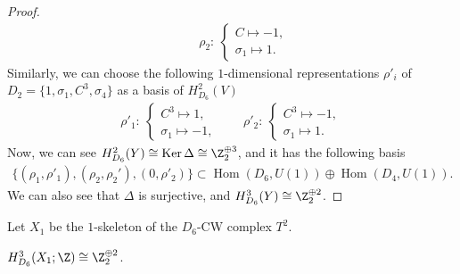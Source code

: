 \begin{proof}
\begin{gather*}
\qquad
\rho_2 \colon \
\begin{cases}
C \mapsto -1, \\
\sigma_1 \mapsto 1.
\end{cases}
\end{gather*}
Similarly, we can choose the following $1$-dimensional representations $\rho'_i$ of $D_2 = \{ 1, \sigma_1, C^3, \sigma_4 \}$ as a basis of $H^2_{D_6}(V)$
\begin{gather*}
\rho'_1 \colon \
\begin{cases}
C^3 \mapsto 1, \\
\sigma_1 \mapsto -1,
\end{cases}
\qquad
\rho'_2 \colon \
\begin{cases}
C^3 \mapsto -1, \\
\sigma_1 \mapsto 1.
\end{cases}
\end{gather*}
Now, we can see $H^2_{D_6}(Y) \cong \operatorname{Ker}\Delta \cong \Z_2^{\oplus 3}$, and it has the following basis
\begin{gather*}
\{ (\rho_1, \rho'_1), (\rho_2, \rho_2'), (0, \rho'_2) \} \subset \operatorname{Hom}(D_6, U(1)) \oplus \operatorname{Hom}(D_4, U(1)).
\end{gather*}
We can also see that $\Delta$ is surjective, and $H^3_{D_6}(Y) \cong \Z_2^{\oplus 2}$.
\end{proof}

Let $X_1$ be the $1$-skeleton of the $D_6$-CW complex $T^2$.

\begin{lem}
$H^3_{D_6}(X_1; \Z) \cong \Z_2^{\oplus 2}$.
\end{lem}

